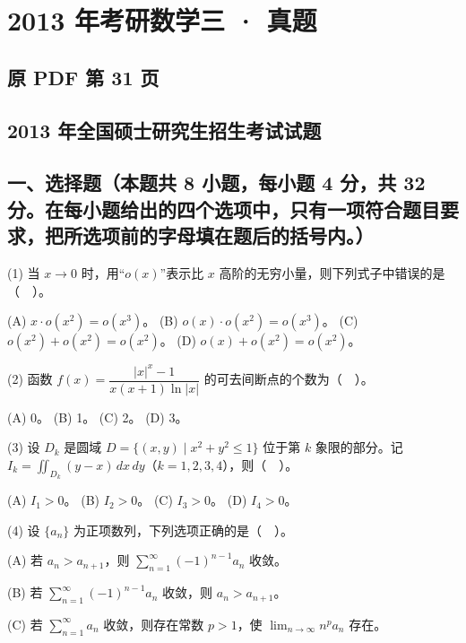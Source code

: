 \documentclass[UTF8,12pt]{ctexart}
\begin{document}
\section*{2013 年考研数学三 · 真题}
\subsection*{原 PDF 第 31 页}

\subsection*{2013 年全国硕士研究生招生考试试题}

\subsection*{一、选择题（本题共 8 小题，每小题 4 分，共 32 分。在每小题给出的四个选项中，只有一项符合题目要求，把所选项前的字母填在题后的括号内。）}

(1) 当 \(\displaystyle x\to0\) 时，用“\(\displaystyle o(x)\)”表示比 \(\displaystyle x\) 高阶的无穷小量，则下列式子中错误的是（　）。


(A) \(\displaystyle x\cdot o(x^2)=o(x^3)\)。 (B) \(\displaystyle o(x)\cdot o(x^2)=o(x^3)\)。 (C) \(\displaystyle o(x^2)+o(x^2)=o(x^2)\)。 (D) \(\displaystyle o(x)+o(x^2)=o(x^2)\)。


(2) 函数 \(\displaystyle f(x)=\dfrac{\displaystyle |x|^x-1}{\displaystyle x(x+1)\ln|x|}\) 的可去间断点的个数为（　）。


(A) 0。 (B) 1。 (C) 2。 (D) 3。


(3) 设 \(\displaystyle D_k\) 是圆域 \(\displaystyle D=\{(x,\allowbreak y)\mid x^2+y^2\leq1\}\) 位于第 \(\displaystyle k\) 象限的部分。记 \(\displaystyle I_k=\displaystyle \iint_{D_k}(y-x)\,dx\,dy\)（\(\displaystyle k=1,\allowbreak 2,\allowbreak 3,\allowbreak 4\)），则（　）。


(A) \(\displaystyle I_1>0\)。 (B) \(\displaystyle I_2>0\)。 (C) \(\displaystyle I_3>0\)。 (D) \(\displaystyle I_4>0\)。


(4) 设 \(\displaystyle \{a_n\}\) 为正项数列，下列选项正确的是（　）。


(A) 若 \(\displaystyle a_n>a_{n+1}\)，则 \(\displaystyle \sum_{n=1}^{\infty}(-1)^{n-1}a_n\) 收敛。


(B) 若 \(\displaystyle \sum_{n=1}^{\infty}(-1)^{n-1}a_n\) 收敛，则 \(\displaystyle a_n>a_{n+1}\)。


(C) 若 \(\displaystyle \sum_{n=1}^{\infty}a_n\) 收敛，则存在常数 \(\displaystyle p>1\)，使 \(\displaystyle \lim_{n\to\infty}n^pa_n\) 存在。
\end{document}
